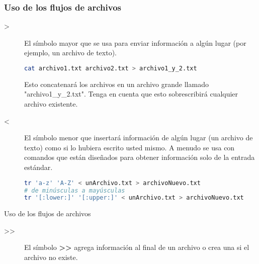 \begin{frame}[fragile]
  \frametitle{Uso de los flujos de archivos}

  \begin{description}
    \item[>] 
      El símbolo mayor que se usa para enviar información a algún lugar
      (por ejemplo, un archivo de texto).
      
      \begin{lstlisting}[language=Bash]
cat archivo1.txt archivo2.txt > archivo1_y_2.txt
      \end{lstlisting}

      Esto concatenará los archivos en un archivo grande llamado
      "archivo1\_y\_2.txt". Tenga en cuenta que esto sobrescribirá
      cualquier archivo existente.

    \pausa
    \vspace{\baselineskip}
    \item[<]
      El símbolo menor que insertará información de algún lugar (un archivo
      de texto) como si lo hubiera escrito usted mismo. A menudo se usa con
      comandos que están diseñados para obtener información solo de la
      entrada estándar.

      \begin{lstlisting}[language=Bash]
tr 'a-z' 'A-Z' < unArchivo.txt > archivoNuevo.txt
# de minúsculas a mayúsculas
tr '[:lower:]' '[:upper:]' < unArchivo.txt > archivoNuevo.txt
      \end{lstlisting}
  \end{description}
\end{frame}

\begin{frame}[c]{Uso de los flujos de archivos}
  \begin{description}
    \item[>{}>] 
      El símbolo \textbf{>{}>} agrega información al final de un archivo o
      crea una si el archivo no existe.
  \end{description}
\end{frame}

